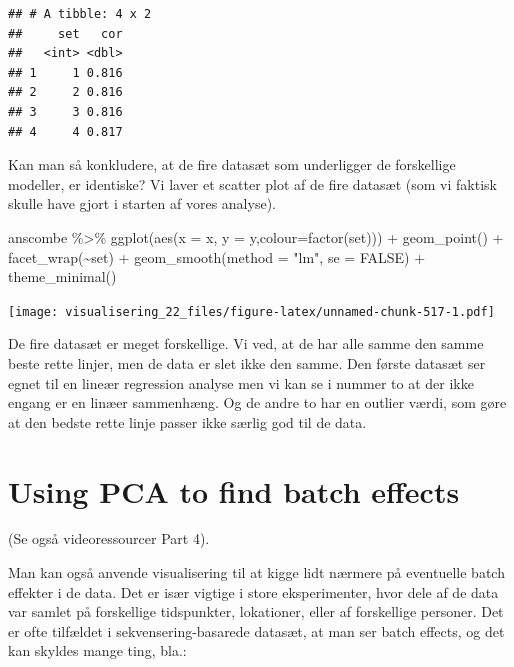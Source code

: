 \documentclass[
]{book}
\newenvironment{Shaded}{\begin{snugshade}}{\end{snugshade}}
\newcommand{\AttributeTok}[1]{\textcolor[rgb]{0.77,0.63,0.00}{#1}}
\newcommand{\ConstantTok}[1]{\textcolor[rgb]{0.00,0.00,0.00}{#1}}
\newcommand{\FunctionTok}[1]{\textcolor[rgb]{0.00,0.00,0.00}{#1}}
\newcommand{\NormalTok}[1]{#1}
\newcommand{\SpecialCharTok}[1]{\textcolor[rgb]{0.00,0.00,0.00}{#1}}
\newcommand{\StringTok}[1]{\textcolor[rgb]{0.31,0.60,0.02}{#1}}
\begin{document}
\begin{verbatim}
## # A tibble: 4 x 2
##     set   cor
##   <int> <dbl>
## 1     1 0.816
## 2     2 0.816
## 3     3 0.816
## 4     4 0.817
\end{verbatim}

Kan man så konkludere, at de fire datasæt som underligger de forskellige modeller, er identiske? Vi laver et scatter plot af de fire datasæt (som vi faktisk skulle have gjort i starten af vores analyse).

\begin{Shaded}
\begin{Highlighting}[]
\NormalTok{anscombe }\SpecialCharTok{\%\textgreater{}\%} 
  \FunctionTok{ggplot}\NormalTok{(}\FunctionTok{aes}\NormalTok{(}\AttributeTok{x =}\NormalTok{ x, }\AttributeTok{y =}\NormalTok{ y,}\AttributeTok{colour=}\FunctionTok{factor}\NormalTok{(set))) }\SpecialCharTok{+}
  \FunctionTok{geom\_point}\NormalTok{() }\SpecialCharTok{+} 
  \FunctionTok{facet\_wrap}\NormalTok{(}\SpecialCharTok{\textasciitilde{}}\NormalTok{set) }\SpecialCharTok{+}
  \FunctionTok{geom\_smooth}\NormalTok{(}\AttributeTok{method =} \StringTok{"lm"}\NormalTok{, }\AttributeTok{se =} \ConstantTok{FALSE}\NormalTok{) }\SpecialCharTok{+} 
  \FunctionTok{theme\_minimal}\NormalTok{()}
\end{Highlighting}
\end{Shaded}

\texttt{[image: visualisering\_22\_files/figure-latex/unnamed-chunk-517-1.pdf]}

De fire datasæt er meget forskellige. Vi ved, at de har alle samme den samme beste rette linjer, men de data er slet ikke den samme. Den første datasæt ser egnet til en lineær regression analyse men vi kan se i nummer to at der ikke engang er en linæer sammenhæng. Og de andre to har en outlier værdi, som gøre at den bedste rette linje passer ikke særlig god til de data.

\hypertarget{using-pca-to-find-batch-effects}{%
\section{Using PCA to find batch effects}\label{using-pca-to-find-batch-effects}}

(Se også videoressourcer Part 4).

Man kan også anvende visualisering til at kigge lidt nærmere på eventuelle batch effekter i de data. Det er især vigtige i store eksperimenter, hvor dele af de data var samlet på forskellige tidspunkter, lokationer, eller af forskellige personer. Det er ofte tilfældet i sekvensering-basarede datasæt, at man ser batch effects, og det kan skyldes mange ting, bla.:
\end{document}
